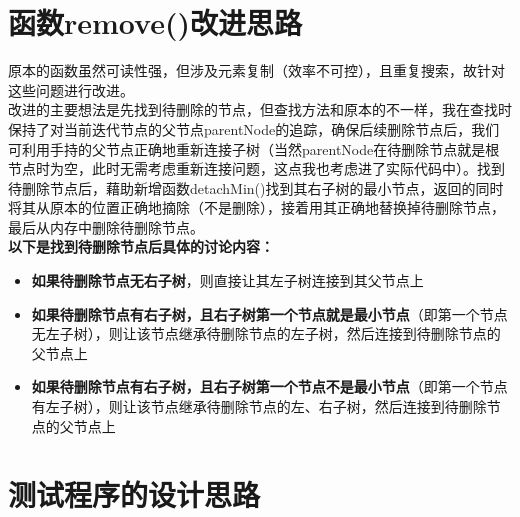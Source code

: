 \documentclass[UTF8]{ctexart}
\begin{document}
\pagestyle{fancy}
\fancyhead{}
\section{函数remove()改进思路}
原本的函数虽然可读性强，但涉及元素复制（效率不可控），且重复搜索，故针对这些问题进行改进。\\
改进的主要想法是先找到待删除的节点，但查找方法和原本的不一样，我在查找时保持了对当前迭代节点的父节点parentNode的追踪，确保后续删除节点后，我们可利用手持的父节点正确地重新连接子树（当然parentNode在待删除节点就是根节点时为空，此时无需考虑重新连接问题，这点我也考虑进了实际代码中）。找到待删除节点后，藉助新增函数detachMin()找到其右子树的最小节点，返回的同时将其从原本的位置正确地摘除（不是删除），接着用其正确地替换掉待删除节点，最后从内存中删除待删除节点。\\
\textbf{以下是找到待删除节点后具体的讨论内容：}
\begin{itemize}

  \item \textbf{如果待删除节点无右子树}，则直接让其左子树连接到其父节点上
  \item \textbf{如果待删除节点有右子树，且右子树第一个节点就是最小节点}（即第一个节点无左子树），则让该节点继承待删除节点的左子树，然后连接到待删除节点的父节点上
  \item \textbf{如果待删除节点有右子树，且右子树第一个节点不是最小节点}（即第一个节点有左子树），则让该节点继承待删除节点的左、右子树，然后连接到待删除节点的父节点上
\end{itemize}
\section{测试程序的设计思路}
\end{document}
